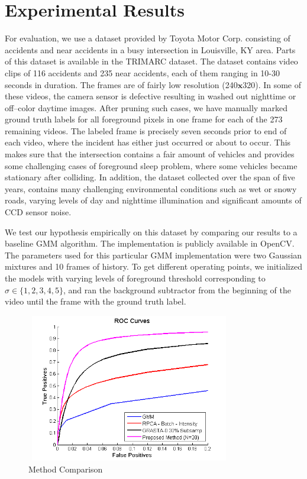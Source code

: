 \documentclass{article}
\begin{document}
\section{Experimental Results}
For evaluation, we use a dataset provided by Toyota Motor Corp. consisting of accidents and near accidents in a busy intersection in Louisville, KY area.  Parts of this dataset is available in the TRIMARC dataset\cite{toyota_dataset}.  The dataset contains video clips of 116 accidents and 235 near accidents, each of them ranging in 10-30 seconds in duration.  The frames are of fairly low resolution (240$\mathbf{x}$320). In some of these videos, the camera sensor is defective resulting in washed out nighttime or off--color daytime images.  After pruning such cases, we have manually marked ground truth labels for all foreground pixels in one frame for each of the 273 remaining videos.  The labeled frame is precisely seven seconds prior to end of each video, where the incident has either just occurred or about to occur.  This makes sure that the intersection contains a fair amount of vehicles and provides some challenging cases of foreground sleep problem, where some vehicles became stationary after colliding.  In addition, the dataset collected over the span of five years, contains many challenging environmental conditions such as wet or snowy roads, varying levels of day and nighttime illumination and significant amounts of CCD sensor noise.

We test our hypothesis empirically on this dataset by comparing our results to a baseline GMM\cite{ZivGMM} algorithm.  The implementation is publicly available in OpenCV\cite{opencv_library}.  The parameters used for this particular GMM implementation were two Gaussian mixtures and 10 frames of history.  To get different operating points, we initialized the models with varying levels of foreground threshold corresponding to $\sigma \in \{1, 2, 3, 4, 5\}$, and ran the background subtractor from the beginning of the video until the frame with the ground truth label.

\begin{figure}[htb]
\begin{minipage}[b]{\linewidth}
  \centering
  \centerline{\includegraphics[width=9cm, height = 6.5cm]{Imgs/ROC_comp_curve_zoom.png}}
\end{minipage}

\caption{Method Comparison}
\label{fig:roc}
\end{figure}
\end{document}

